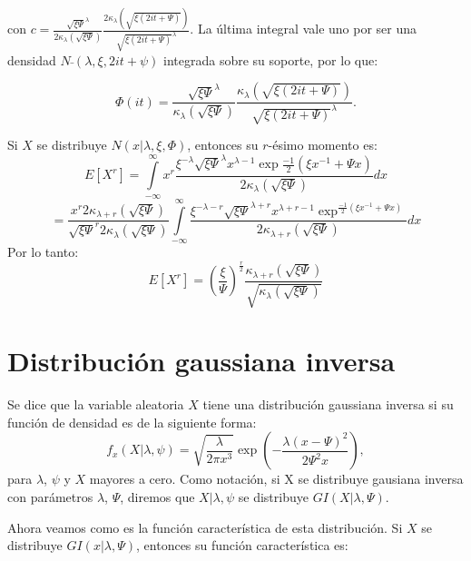 con $c=\frac{\sqrt{\xi\Psi}^{\lambda}}{2\kappa_{\lambda}(\sqrt{\xi\Psi})}\frac{2\kappa_{\lambda}(\sqrt{\xi(2it + \Psi)})}{\sqrt{\xi(2it + \Psi)}^{\lambda}}$. La última integral vale uno por ser una densidad $N\bar{}(\lambda,\xi,2it + \psi)$ integrada sobre su soporte, por lo que:

\begin{equation*}
	\Phi(it)=\frac{\sqrt{\xi\Psi}^{\lambda}}{\kappa_{\lambda}(\sqrt{\xi\Psi})}\frac{\kappa_{\lambda}(\sqrt{\xi(2it + \Psi)})}{\sqrt{\xi(2it + \Psi)}^{\lambda}}.
\end{equation*}

Si $X$ se distribuye $N\tilde{}(x|\lambda,\xi,\Phi)$, entonces su $r$-ésimo momento es:
\begin{equation*}
	E[X^{r}]=\underset{-\infty }{\overset{\infty }{\int }}x^{r}\dfrac{\xi^{-\lambda}\sqrt{\xi\Psi}^{\lambda}x^{\lambda-1}\exp{\frac{-1}{2}(\xi x^{-1} + \Psi x)}}{2\kappa_{\lambda}(\sqrt{\xi\Psi})}dx
\end{equation*}
\begin{equation*}
	=\frac{x^{r}2\kappa_{\lambda+r}(\sqrt{\xi\Psi})}{\sqrt{\xi\Psi}^{r}2\kappa_{\lambda}(\sqrt{\xi\Psi})}\underset{-\infty }{\overset{\infty }{\int }}\dfrac{\xi^{-\lambda-r}\sqrt{\xi\Psi}^{\lambda+r}x^{\lambda+r-1}\exp^{{\frac{-1}{2}(\xi x^{-1} + \Psi x)}}}{2\kappa_{\lambda+r}(\sqrt{\xi\Psi})}dx
\end{equation*}
Por lo tanto:
\begin{equation*}
	E[X^{r}]=(\frac{\xi}{\Psi})^{\frac{r}{2}}\frac{\kappa_{\lambda+r}(\sqrt{\xi \Psi})}{\sqrt{\kappa_{\lambda}(\sqrt{\xi\Psi})}}
\end{equation*}

\section{Distribución gaussiana inversa}
Se dice que la variable aleatoria $X$ tiene una distribución gaussiana inversa si su función de densidad es de la siguiente forma:
\begin{equation*}
	f_{x}(X|\lambda,\psi)=\sqrt{\dfrac{\lambda}{2\pi x^{3}}}\exp(-\dfrac{\lambda(x-\Psi)^{2}}{2\Psi^{2}x}),
\end{equation*}
para $\lambda$, $\psi$ y $X$ mayores a cero.
Como notación, si X se distribuye gausiana inversa con parámetros $\lambda$, $\Psi$, diremos que $X|\lambda,\psi$ se distribuye $GI(X|\lambda,\Psi)$.

Ahora veamos como es la función característica de esta distribución.
Si $X$ se distribuye $GI(x|\lambda,\Psi)$, entonces su función característica es:

